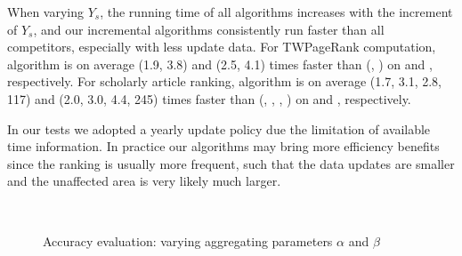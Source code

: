 When varying $Y_s$, the running time of all algorithms increases with the increment of $Y_s$, and our incremental algorithms
consistently run faster than all competitors, especially with less update data.
%
For TWPageRank computation, algorithm \inctwprscc is on average (1.9, 3.8) and (2.5, 4.1) times faster than (\twprscc, \powtwprscc) on \aminer and \magdata, respectively.
%
For scholarly article ranking, algorithm \incensemble is on average (1.7, 3.1, 2.8, 117) and (2.0, 3.0, 4.4, 245) times faster than (\batensemble, \powensemble, \futurerank, \hhgrank) on \aminer and \magdata, respectively.

In our tests we adopted a yearly update policy due the limitation of  available time information. In practice our algorithms may bring more efficiency benefits since the ranking is usually more frequent, such that the data updates are smaller and the unaffected area is very likely much larger.



\newcommand{\graphscaleexpapp}{0.25}
\newcommand{\graphmarginexpapp}{-2ex}
\begin{figure}[tb!]
\addtolength{\subfigcapskip}{-1ex}
\begin{center}
\hfill
{}
\hfill
{}
\\ %
\vspace{-2ex}
\hfill
{}
\hfill
{}
\end{center}
\vspace{-1.5ex}
\caption{\small Accuracy evaluation: varying aggregating parameters $\alpha$ and $\beta$}
\label{exp-ab}
\vspace{-2ex}
\end{figure}

